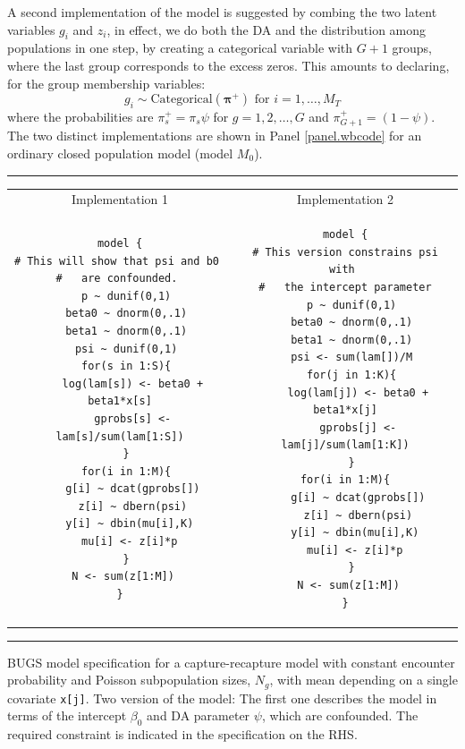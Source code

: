 A
second implementation of the model is suggested by combing the two
latent variables $g_{i}$ and $z_{i}$,
in effect, we do both the DA and the distribution among populations in
one step,
by creating a categorical variable with $G+1$
groups, where the last group corresponds to the excess zeros. 
This amounts to declaring, for the group membership variables:  
\begin{equation}
g_{i}  \sim \mbox{Categorical}( {\bm \pi}^{+} ) \mbox{ for
  $i=1,\ldots,M_{T}$}  \label{eq.parm1c}
\end{equation}
where 
the probabilities are $\pi_{s}^{+} = \pi_{s} \psi$
for $g=1,2,\ldots,G$ and $\pi_{G+1}^{+} = (1-\psi)$.
The two distinct implementations are shown in Panel \ref{panel.wbcode}
for an ordinary closed population model (model $M_{0}$).

\begin{panel}[htp]   
\renewcommand{\baselinestretch}{1.0}
\centering
\rule[0.15in]{\textwidth}{.03in}
\begin{tabular}{cc}
Implementation 1 & Implementation 2 \\
\begin{minipage}{2.75in}
{\small
\begin{verbatim}
model {
# This will show that psi and b0 
#   are confounded. 
  p ~ dunif(0,1)
  beta0 ~ dnorm(0,.1)
  beta1 ~ dnorm(0,.1)
  psi ~ dunif(0,1)
  for(s in 1:S){
    log(lam[s]) <- beta0 + beta1*x[s]
    gprobs[s] <- lam[s]/sum(lam[1:S])
  }
  for(i in 1:M){
    g[i] ~ dcat(gprobs[])
    z[i] ~ dbern(psi)
   y[i] ~ dbin(mu[i],K)
   mu[i] <- z[i]*p
  }
  N <- sum(z[1:M]) 
}
\end{verbatim}
}
\end{minipage}
&
\begin{minipage}{2.75in}
{\small
\begin{verbatim}
model {
# This version constrains psi with 
#   the intercept parameter
  p ~ dunif(0,1)
  beta0 ~ dnorm(0,.1)
  beta1 ~ dnorm(0,.1)
  psi <- sum(lam[])/M
  for(j in 1:K){
    log(lam[j]) <- beta0 + beta1*x[j]
    gprobs[j] <- lam[j]/sum(lam[1:K])
  }
  for(i in 1:M){  
    g[i] ~ dcat(gprobs[])
    z[i] ~ dbern(psi)
   y[i] ~ dbin(mu[i],K)
   mu[i] <- z[i]*p
  }
  N <- sum(z[1:M]) 
}
\end{verbatim}
}
\end{minipage}
\end{tabular}
\rule[-0.15in]{\textwidth}{.03in}
\caption{BUGS model specification for a capture-recapture model with
  constant encounter probability and Poisson subpopulation sizes,
  $N_{g}$, with mean depending on a single covariate \mbox{\tt x[j]}. 
Two version of the model: The first one describes the model in terms
of the intercept $\beta_0$ and DA parameter $\psi$, which are
confounded. The required constraint is indicated in the specification
on the RHS. 
}
\label{panel.wbcode}
\end{panel}

